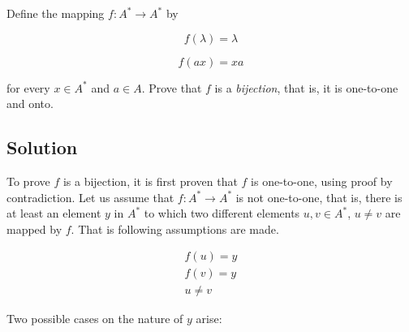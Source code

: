 Define the mapping $f:A^*\rightarrow A^*$ by

\begin{equation}\label{assum1}
f(\lambda)=\lambda
\end{equation}

\begin{equation}\label{assum2}
f(ax)=xa
\end{equation}

for every $x \in A^*$ and $a \in A$.
Prove that $f$ is a \textit{bijection}, that is, it is one-to-one and onto.

\subsection*{Solution}

To prove $f$ is a bijection, it is first proven that $f$ is one-to-one, using proof by contradiction.
Let us assume that $f: A^* \rightarrow A^*$ is not one-to-one, that is, there is at least an element $y$ in $A^*$ to which two different elements $u, v \in A^*$, $u \neq v$ are mapped by $f$.
That is following assumptions are made.

\begin{eqnarray}
f(u) = y \label{assum3} \\
f(v) = y \label{assum4} \\
u \neq v \label{assum5}
\end{eqnarray}

Two possible cases on the nature of $y$ arise:

